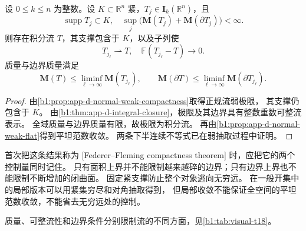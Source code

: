 \begin{theorem}\label{b1:thm:app-d-federer-fleming-compactness}
设 \(0\le k\le n\) 为整数。设 \(K\subset\mathbb R^n\) 紧，\(T_j\in\mathbf I_k(\mathbb R^n)\)，且
\[
 \operatorname{supp}T_j\subset K,\quad
 \sup_j\bigl(\mathbf M(T_j)+\mathbf M(\partial T_j)\bigr)<\infty.
\]
则存在积分流 \(T\)，其支撑包含于 \(K\)，以及子列使
\[
 T_{j_\ell}\rightharpoonup T,\quad
 \mathbb F(T_{j_\ell}-T)\longrightarrow0.
\]
质量与边界质量满足
\[
 \mathbf M(T)\leq\liminf_{\ell\to\infty}\mathbf M(T_{j_\ell}),\qquad
 \mathbf M(\partial T)\leq\liminf_{\ell\to\infty}\mathbf M(\partial T_{j_\ell}).
\]
\end{theorem}
\begin{proof}
由\cref{b1:prop:app-d-normal-weak-compactness}取得正规流弱极限，
其支撑仍包含于 \(K\)。
由\cref{b1:thm:app-d-integral-closure}，极限及其边界具有整数重数可整流表示。
全域质量与边界质量有限，故极限为积分流。
再由\cref{b1:prop:app-d-normal-weak-flat}得到平坦范数收敛。
两条下半连续不等式已在弱抽取过程中证明。
\end{proof}

首次把这条结果称为%
[Federer--Fleming compactness theorem]%
时，应把它的两个控制量同时记住。
只有面积上界并不能限制越来越碎的边界；只有边界上界也不能限制不断增加的闭曲面。
固定紧支撑防止整个对象逃向无穷远。
在一般开集中的局部版本可以用紧集穷尽和对角抽取得到，
但局部收敛不能保证全空间的平坦范数收敛，不能省去无穷远处的控制。

质量、可整流性和边界条件分别限制流的不同方面，见\cref{b1:tab:visual-t18}。

